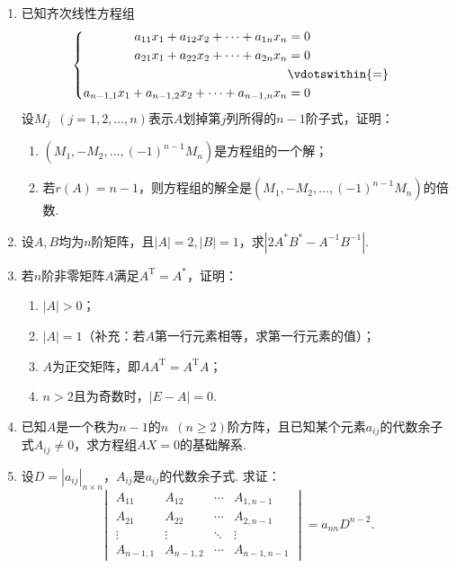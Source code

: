 \begin{enumerate}
    \item 已知齐次线性方程组
          \[\begin{cases} \begin{aligned}
                      a_{11}x_1+a_{12}x_2+\cdots+a_{1n}x_n          & = 0             \\
                      a_{21}x_1+a_{22}x_2+\cdots+a_{2n}x_n          & = 0             \\
                                                                    & \vdotswithin{=} \\
                      a_{n-1,1}x_1+a_{n-1,2}x_2+\cdots+a_{n-1,n}x_n & = 0
                  \end{aligned} \end{cases}\]
          设$M_j\enspace(j=1,2,\ldots,n)$表示$A$划掉第$j$列所得的$n-1$阶子式，证明：
          \begin{enumerate}
              \item $(M_1,-M_2,\ldots,(-1)^{n-1}M_n)$是方程组的一个解；

              \item 若$r(A)=n-1$，则方程组的解全是$(M_1,-M_2,\ldots,(-1)^{n-1}M_n)$的倍数.
          \end{enumerate}

    \item 设$A,B$均为$n$阶矩阵，且$|A|=2,|B|=1$，求$|2A^*B^*-A^{-1}B^{-1}|$.

    \item 若$n$阶非零矩阵$A$满足$A^\mathrm{T}=A^*$，证明：
          \begin{enumerate}
              \item $|A|>0$；

              \item $|A|=1$（补充：若$A$第一行元素相等，求第一行元素的值）；

              \item $A$为正交矩阵，即$AA^\mathrm{T}=A^\mathrm{T}A$；

              \item $n>2$且为奇数时，$|E-A|=0$.
          \end{enumerate}

    \item 已知$A$是一个秩为$n-1$的$n\enspace(n \geqslant 2)$阶方阵，且已知某个元素$a_{ij}$的代数余子式$A_{ij} \neq 0$，求方程组$AX=0$的基础解系.

    \item 设$D=|a_{ij}|_{n \times n}$，$A_{ij}$是$a_{ij}$的代数余子式. 求证：
          \[\begin{vmatrix}
                  A_{11}    & A_{12}    & \cdots & A_{1,n-1}   \\
                  A_{21}    & A_{22}    & \cdots & A_{2,n-1}   \\
                  \vdots    & \vdots    & \ddots & \vdots      \\
                  A_{n-1,1} & A_{n-1,2} & \cdots & A_{n-1,n-1}
              \end{vmatrix}=a_{nn}D^{n-2}.\]


\end{enumerate}
